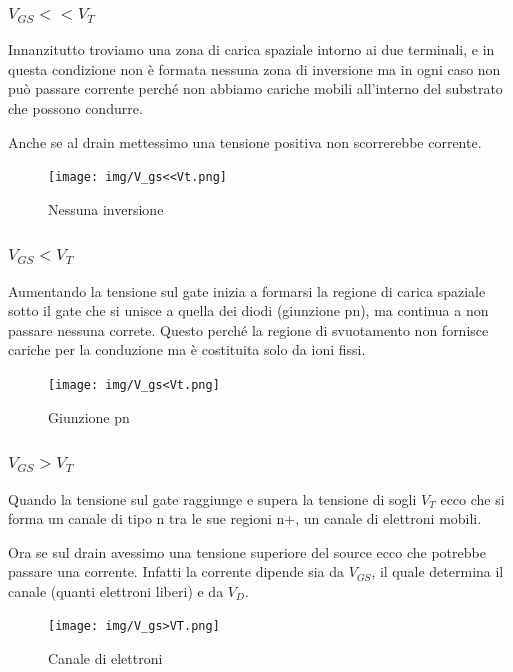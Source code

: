 \subsubsection{$V_{GS} << V_T$}

Innanzitutto troviamo una zona di carica spaziale intorno ai due terminali, e in questa condizione non è formata nessuna zona di inversione ma in ogni caso non può passare corrente perché non abbiamo cariche mobili all'interno del substrato che possono condurre.

Anche se al drain mettessimo una tensione positiva non scorrerebbe corrente.

\begin{figure}[htbp]
    \centering
    \texttt{[image: img/V\_gs<<Vt.png]}
    \caption{Nessuna inversione}
    
\end{figure}

\subsubsection{$V_{GS} < V_T$}

Aumentando la tensione sul gate inizia a formarsi la regione di carica spaziale sotto il gate che si unisce a quella dei diodi (giunzione pn), ma continua a non passare nessuna correte. Questo perché la regione di svuotamento non fornisce cariche per la conduzione ma è costituita solo da ioni fissi.



\begin{figure}[htbp]
    \centering
    \texttt{[image: img/V\_gs<Vt.png]}
    \caption{Giunzione pn}
    
\end{figure}

\subsubsection{$V_{GS} > V_T$}
Quando la tensione sul gate raggiunge e supera la tensione di sogli $V_T$ ecco che si forma un canale di tipo n tra le sue regioni n+, un canale di elettroni mobili.

Ora se sul drain avessimo una tensione superiore del source ecco che potrebbe passare una corrente. Infatti la corrente dipende sia da $V_{GS}$, il quale determina il canale (quanti elettroni liberi) e da $V_D$.

\begin{figure}[htbp]
    \centering
    \texttt{[image: img/V\_gs>VT.png]}
    \caption{Canale di elettroni}    
\end{figure}

